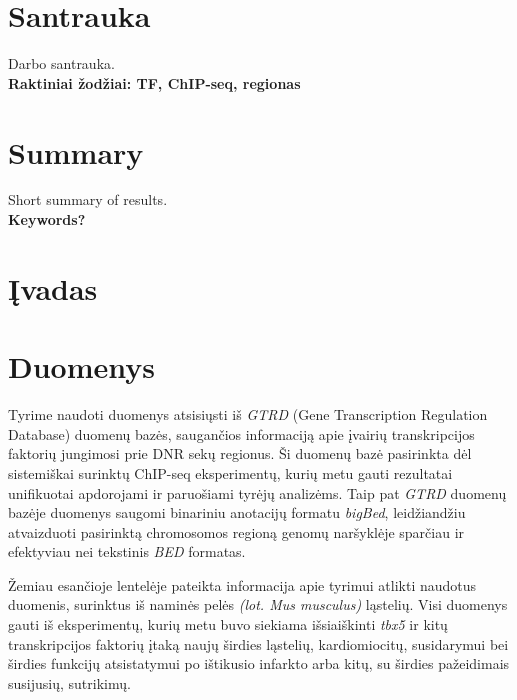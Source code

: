 \documentclass[12pt]{article}
\begin{document}
\section*{Santrauka}
Darbo santrauka.\\

\textbf{Raktiniai žodžiai: TF, ChIP-seq, regionas}
\newpage

\section*{Summary}
Short summary of results.\\

\textbf{Keywords?}
\newpage

\section{Įvadas}
\newpage

\section{Duomenys}

Tyrime naudoti duomenys atsisiųsti iš \emph{GTRD} (Gene Transcription
Regulation Database) duomenų bazės, saugančios informaciją apie įvairių
transkripcijos faktorių jungimosi prie DNR sekų regionus. Ši duomenų
bazė pasirinkta dėl sistemiškai surinktų ChIP-seq eksperimentų, kurių
metu gauti rezultatai unifikuotai apdorojami ir paruošiami tyrėjų
analizėms. Taip pat \emph{GTRD} duomenų bazėje duomenys saugomi
binariniu anotacijų formatu \emph{bigBed}, leidžiandžiu atvaizduoti
pasirinktą chromosomos regioną genomų naršyklėje sparčiau ir 
efektyviau nei tekstinis \emph{BED} formatas.

Žemiau esančioje lentelėje pateikta informacija apie tyrimui atlikti
naudotus duomenis, surinktus iš naminės pelės \emph{(lot. Mus musculus)}
ląstelių. Visi duomenys gauti iš eksperimentų, kurių metu buvo
siekiama išsiaiškinti \emph{tbx5} ir kitų transkripcijos faktorių
įtaką naujų širdies ląstelių, kardiomiocitų, susidarymui bei širdies
funkcijų atsistatymui po ištikusio infarkto arba kitų, su širdies
pažeidimais susijusių, sutrikimų.
\end{document}
